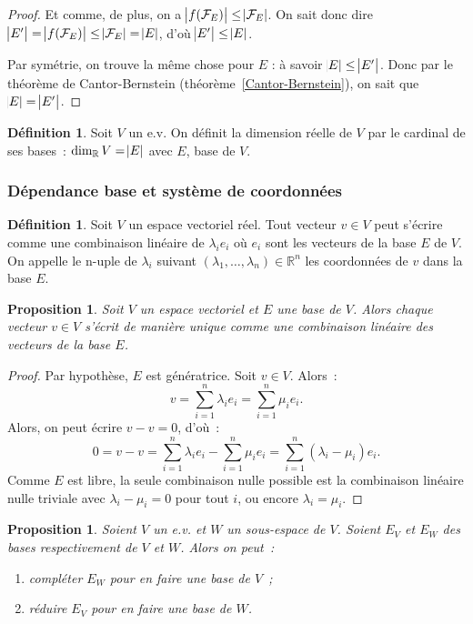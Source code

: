 \documentclass{article}
\newcommand{\R}{\mathbb R}
\newtheorem{prp}[thm]{Proposition}
\theoremstyle{definition}
\newtheorem{déf}[thm]{Définition}
\theoremstyle{remark}
\begin{document}
\begin{proof}
		Et comme, de plus, on a $\abs {f(\mathcal F_E)} \leq \abs {\mathcal F_E}$. On sait donc dire
		$\abs {E'} = \abs {f(\mathcal F_E)} \leq \abs {\mathcal F_E} = \abs E$, d'où $\abs {E'} \leq \abs E$.

		Par symétrie, on trouve la même chose pour $E$ : à savoir $\abs E \leq \abs {E'}$. Donc par le théorème de Cantor-Bernstein (théorème~\ref{Cantor-Bernstein}), on
		sait que $\abs E = \abs {E'}$. \end{proof}

		\begin{déf} Soit $V$ un e.v. On définit la dimension réelle de $V$ par le cardinal de ses bases~: $\dim_\R V = \abs E$ avec $E$, base de $V$. \end{déf}

		\subsubsection{Dépendance base et système de coordonnées}
		\begin{déf} Soit $V$ un espace vectoriel réel. Tout vecteur $v \in V$ peut s'écrire comme une combinaison linéaire de $\lambda_ie_i$ où $e_i$ sont les vecteurs
		de la base $E$ de $V$. On appelle le n-uple de $\lambda_i$ suivant $(\lambda_1, \dotsc, \lambda_n) \in \R^n$ les coordonnées de $v$ dans la base $E$. \end{déf}

		\begin{prp} Soit $V$ un espace vectoriel et $E$ une base de $V$. Alors chaque vecteur $v \in V$ s'écrit de manière unique comme une combinaison linéaire des
		vecteurs de la base $E$. \end{prp}

		\begin{proof} Par hypothèse, $E$ est génératrice. Soit $v \in V$. Alors~: \[v = \sum_{i=1}^n\lambda_ie_i = \sum_{i=1}^n\mu_ie_i.\] Alors, on peut écrire
		$v-v = 0$, d'où~: \[0 = v - v = \sum_{i=1}^n\lambda_ie_i - \sum_{i=1}^n\mu_ie_i = \sum_{i=1}^n(\lambda_i - \mu_i)e_i.\] Comme $E$ est libre, la seule combinaison
		nulle possible est la combinaison linéaire nulle triviale avec $\lambda_i-\mu_i=0$ pour tout $i$, ou encore $\lambda_i = \mu_i$. \end{proof}

		\begin{prp}\label{inclusionBases} Soient $V$ un e.v. et $W$ un sous-espace de $V$. Soient $E_V$ et $E_W$ des bases respectivement de $V$ et $W$. Alors on peut~:
		\begin{enumerate}
			\item compléter $E_W$ pour en faire une base de $V$~;
			\item réduire $E_V$ pour en faire une base de $W$.
		\end{enumerate}
		\end{prp}
\end{document}
